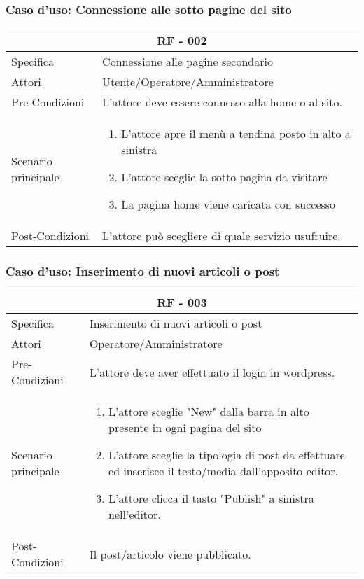 \documentclass{article}
\begin{document}
	\subsubsection{\textbf{Caso d'uso: Connessione alle sotto pagine del sito}}
\begin{tabular}{ |p{3cm}|p{8cm}|  }
	\hline
	\multicolumn{2}{|c|}{\textbf{RF - 002}} \\
	\hline
	Specifica& Connessione alle pagine secondario\\
	\hline
	Attori& Utente/Operatore/Amministratore\\
	\hline
	Pre-Condizioni& L'attore deve essere connesso alla home o al sito.\\
	\hline
	Scenario principale& \begin{enumerate}
		\item L'attore apre il menù a tendina posto in alto a sinistra
		\item L'attore sceglie la sotto pagina da visitare
		\item La pagina home viene caricata con successo
	\end{enumerate}\\
	\hline
	Post-Condizioni& L'attore può scegliere di quale servizio usufruire.\\
	\hline
\end{tabular}
	\subsubsection{\textbf{Caso d'uso: Inserimento di nuovi articoli o post}}
\begin{tabular}{ |p{3cm}|p{8cm}|  }
	\hline
	\multicolumn{2}{|c|}{\textbf{RF - 003}} \\
	\hline
	Specifica& Inserimento di nuovi articoli o post\\
	\hline
	Attori& Operatore/Amministratore\\
	\hline
	Pre-Condizioni& L'attore deve aver effettuato il login in wordpress.\\
	\hline
	Scenario principale& \begin{enumerate}
		\item L'attore sceglie "New" dalla barra in alto presente in ogni pagina del sito
		\item L'attore sceglie la tipologia di post da effettuare ed inserisce il testo/media dall'apposito editor.
		\item L'attore clicca il tasto "Publish" a sinistra nell'editor.
	\end{enumerate}\\
	\hline
	Post-Condizioni& Il post/articolo viene pubblicato.\\
	\hline
\end{tabular}
\end{document}
